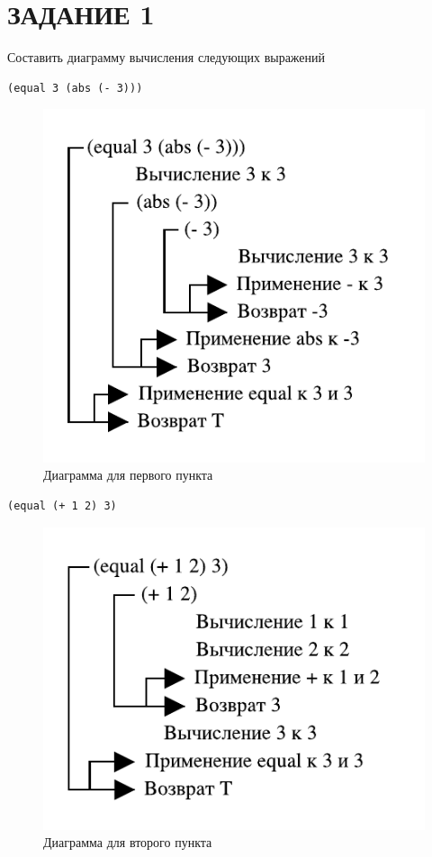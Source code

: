 \section{ЗАДАНИЕ 1}

Составить диаграмму вычисления следующих выражений

\begin{lstlisting}
(equal 3 (abs (- 3)))
\end{lstlisting}

\begin{figure}[H]
    \centering
    \includegraphics{img/01_01.pdf}
    \caption{Диаграмма для первого пункта}
\end{figure}

\begin{lstlisting}
(equal (+ 1 2) 3)
\end{lstlisting}

\begin{figure}[H]
    \centering
    \includegraphics{img/01_02.pdf}
    \caption{Диаграмма для второго пункта}
\end{figure}

